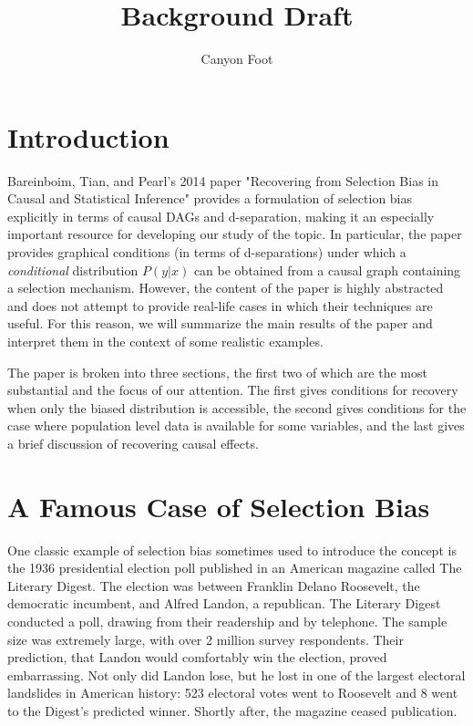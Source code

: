\documentclass[12pt]{article}
\title{\vspace{-3cm} Background Draft}
\author{Canyon Foot}
\theoremstyle{definition}
\begin{document}
\maketitle

\section{Introduction}
Bareinboim, Tian, and Pearl's 2014 paper "Recovering from Selection Bias in Causal and Statistical Inference" provides a formulation of selection bias explicitly in terms of causal DAGs and d-separation, making it an especially important resource for developing our study of the topic. In particular, the paper provides graphical conditions (in terms of d-separations) under which a \emph{conditional} distribution $P(y | x)$ can be obtained from a causal graph containing a selection mechanism. However, the content of the paper is highly abstracted and does not attempt to provide real-life cases in which their techniques are useful. For this reason, we will summarize the main results of the paper and interpret them in the context of some realistic examples. 

The paper is broken into three sections, the first two of which are the most substantial and the focus of our attention. The first gives conditions for recovery when only the biased distribution is accessible, the second gives conditions for the case where population level data is available for some variables, and the last gives a brief discussion of recovering causal effects.

\section{A Famous Case of Selection Bias}
One classic example of selection bias sometimes used to introduce the concept is the 1936 presidential election poll  published in an American magazine called The Literary Digest. The election was between Franklin Delano Roosevelt, the democratic incumbent, and Alfred Landon, a republican. The Literary Digest conducted a poll, drawing from their readership and by telephone. The sample size was extremely large, with over 2 million survey respondents. Their prediction, that Landon would comfortably win the election, proved embarrassing. Not only did Landon lose, but he lost in one of the largest electoral landslides in American history:  523 electoral votes went to Roosevelt and 8 went to the Digest's predicted winner. Shortly after, the magazine ceased publication.
\end{document}

